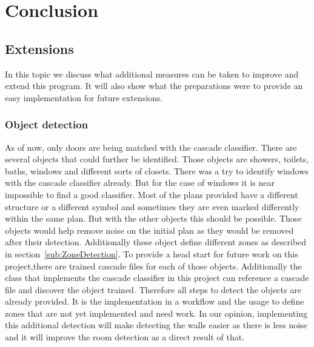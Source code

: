 \section{Conclusion}
\subsection{Extensions}
In this topic we discuss what additional measures can be taken to improve and extend this program. It will also show what the preparations were to provide an easy implementation for future extensions.

\subsubsection{Object detection}
\label{sub:FutureObjectDetection}
As of now, only doors are being matched with the cascade classifier. There are several objects that could further be identified. Those objects are showers, toilets, baths, windows and different sorts of closets.
There was a try to identify windows with the cascade classifier already. But for the case of windows it is near impossible to find a good classifier. Most of the plans provided have a different structure or a different symbol and sometimes they are even marked differently within the same plan. But with the other objects this should be possible. Those objects would help remove noise on the initial plan as they would be removed after their detection. Additionally these object define different zones as described in section~\ref{sub:ZoneDetection}. To provide a head start for future work on this project,there are trained cascade files for each of those objects. Additionally the class that implements the cascade classifier in this project can reference a cascade file and discover the object trained. Therefore all steps to detect the objects are already provided. It is the implementation in a workflow and the usage to define zones that are not yet implemented and need work. In our opinion, implementing this additional detection will make detecting the walls easier as there is less noise and it will improve the room detection as a direct result of that.

